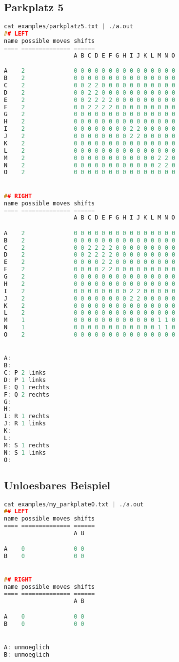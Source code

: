 \documentclass[a4paper,10pt,ngerman]{scrartcl}
\begin{document}
\subsection*{Parkplatz 5}
\begin{lstlisting}[language=C++]
cat examples/parkplatz5.txt | ./a.out
## LEFT
name possible moves shifts
==== ============== ======
                    A B C D E F G H I J K L M N O

A    2              0 0 0 0 0 0 0 0 0 0 0 0 0 0 0
B    2              0 0 0 0 0 0 0 0 0 0 0 0 0 0 0
C    2              0 0 2 2 0 0 0 0 0 0 0 0 0 0 0
D    2              0 0 2 2 0 0 0 0 0 0 0 0 0 0 0
E    2              0 0 2 2 2 2 0 0 0 0 0 0 0 0 0
F    2              0 0 2 2 2 2 0 0 0 0 0 0 0 0 0
G    2              0 0 0 0 0 0 0 0 0 0 0 0 0 0 0
H    2              0 0 0 0 0 0 0 0 0 0 0 0 0 0 0
I    2              0 0 0 0 0 0 0 0 2 2 0 0 0 0 0
J    2              0 0 0 0 0 0 0 0 2 2 0 0 0 0 0
K    2              0 0 0 0 0 0 0 0 0 0 0 0 0 0 0
L    2              0 0 0 0 0 0 0 0 0 0 0 0 0 0 0
M    2              0 0 0 0 0 0 0 0 0 0 0 0 2 2 0
N    2              0 0 0 0 0 0 0 0 0 0 0 0 2 2 0
O    2              0 0 0 0 0 0 0 0 0 0 0 0 0 0 0


## RIGHT
name possible moves shifts
==== ============== ======
                    A B C D E F G H I J K L M N O

A    2              0 0 0 0 0 0 0 0 0 0 0 0 0 0 0
B    2              0 0 0 0 0 0 0 0 0 0 0 0 0 0 0
C    2              0 0 2 2 2 2 0 0 0 0 0 0 0 0 0
D    2              0 0 2 2 2 2 0 0 0 0 0 0 0 0 0
E    2              0 0 0 0 2 2 0 0 0 0 0 0 0 0 0
F    2              0 0 0 0 2 2 0 0 0 0 0 0 0 0 0
G    2              0 0 0 0 0 0 0 0 0 0 0 0 0 0 0
H    2              0 0 0 0 0 0 0 0 0 0 0 0 0 0 0
I    2              0 0 0 0 0 0 0 0 2 2 0 0 0 0 0
J    2              0 0 0 0 0 0 0 0 2 2 0 0 0 0 0
K    2              0 0 0 0 0 0 0 0 0 0 0 0 0 0 0
L    2              0 0 0 0 0 0 0 0 0 0 0 0 0 0 0
M    1              0 0 0 0 0 0 0 0 0 0 0 0 1 1 0
N    1              0 0 0 0 0 0 0 0 0 0 0 0 1 1 0
O    2              0 0 0 0 0 0 0 0 0 0 0 0 0 0 0


A:
B:
C: P 2 links
D: P 1 links
E: Q 1 rechts
F: Q 2 rechts
G:
H:
I: R 1 rechts
J: R 1 links
K:
L:
M: S 1 rechts
N: S 1 links
O:
\end{lstlisting}

\subsection*{Unloesbares Beispiel}
\begin{lstlisting}[language=C++]
cat examples/my_parkplate0.txt | ./a.out
## LEFT
name possible moves shifts
==== ============== ======
                    A B

A    0              0 0
B    0              0 0


## RIGHT
name possible moves shifts
==== ============== ======
                    A B

A    0              0 0
B    0              0 0


A: unmoeglich
B: unmoeglich
\end{lstlisting}
\end{document}
